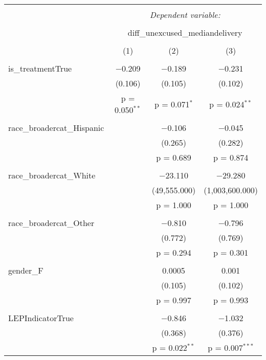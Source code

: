 
\begin{table}[!htbp] \centering 
  \caption{} 
  \label{} 
\begin{tabular}{@{\extracolsep{5pt}}lccc} 
\\[-1.8ex]\hline 
\hline \\[-1.8ex] 
 & \multicolumn{3}{c}{\textit{Dependent variable:}} \\ 
\cline{2-4} 
\\[-1.8ex] & \multicolumn{3}{c}{diff\_unexcused\_mediandelivery} \\ 
\\[-1.8ex] & (1) & (2) & (3)\\ 
\hline \\[-1.8ex] 
 is\_treatmentTrue & $-$0.209 & $-$0.189 & $-$0.231 \\ 
  & (0.106) & (0.105) & (0.102) \\ 
  & p = 0.050$^{**}$ & p = 0.071$^{*}$ & p = 0.024$^{**}$ \\ 
  & & & \\ 
 race\_broadercat\_Hispanic &  & $-$0.106 & $-$0.045 \\ 
  &  & (0.265) & (0.282) \\ 
  &  & p = 0.689 & p = 0.874 \\ 
  & & & \\ 
 race\_broadercat\_White &  & $-$23.110 & $-$29.280 \\ 
  &  & (49,555.000) & (1,003,600.000) \\ 
  &  & p = 1.000 & p = 1.000 \\ 
  & & & \\ 
 race\_broadercat\_Other &  & $-$0.810 & $-$0.796 \\ 
  &  & (0.772) & (0.769) \\ 
  &  & p = 0.294 & p = 0.301 \\ 
  & & & \\ 
 gender\_F &  & 0.0005 & 0.001 \\ 
  &  & (0.105) & (0.102) \\ 
  &  & p = 0.997 & p = 0.993 \\ 
  & & & \\ 
 LEPIndicatorTrue &  & $-$0.846 & $-$1.032 \\ 
  &  & (0.368) & (0.376) \\ 
  &  & p = 0.022$^{**}$ & p = 0.007$^{***}$ \\ 

\end{tabular}
\end{table}
